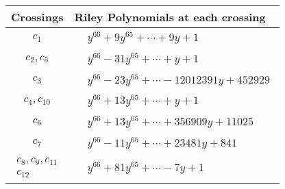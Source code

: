\documentclass[1p]{elsarticle_modified}
\theoremstyle{definition}
\begin{document}
\begin{tabular}{m{50pt}|m{274pt}}
Crossings & \hspace{64pt}Riley Polynomials at each crossing \\
\hline $$\begin{aligned}c_{1}\end{aligned}$$&$\begin{aligned}
&y^{66}+9 y^{65}+\cdots+9 y+1
\end{aligned}$\\
\hline $$\begin{aligned}c_{2},c_{5}\end{aligned}$$&$\begin{aligned}
&y^{66}-31 y^{65}+\cdots+y+1
\end{aligned}$\\
\hline $$\begin{aligned}c_{3}\end{aligned}$$&$\begin{aligned}
&y^{66}-23 y^{65}+\cdots-12012391 y+452929
\end{aligned}$\\
\hline $$\begin{aligned}c_{4},c_{10}\end{aligned}$$&$\begin{aligned}
&y^{66}+13 y^{65}+\cdots+y+1
\end{aligned}$\\
\hline $$\begin{aligned}c_{6}\end{aligned}$$&$\begin{aligned}
&y^{66}+13 y^{65}+\cdots+356909 y+11025
\end{aligned}$\\
\hline $$\begin{aligned}c_{7}\end{aligned}$$&$\begin{aligned}
&y^{66}-11 y^{65}+\cdots+23481 y+841
\end{aligned}$\\
\hline $$\begin{aligned}c_{8},c_{9},c_{11}\\c_{12}\end{aligned}$$&$\begin{aligned}
&y^{66}+81 y^{65}+\cdots-7 y+1
\end{aligned}$\\
\hline
\end{tabular}
\vskip 2pc
\end{document}
